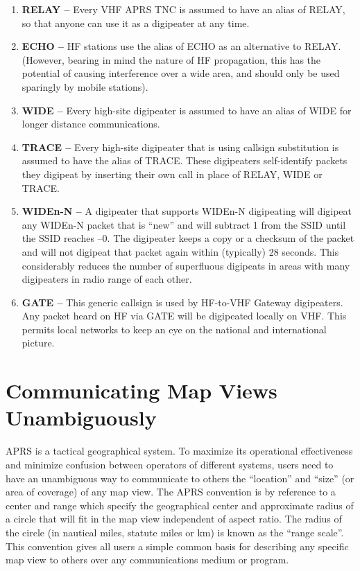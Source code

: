 \begin{enumerate}

\item \textbf{RELAY --} Every VHF APRS TNC is assumed to have an alias of
RELAY, so that anyone can use it as a digipeater at any time.

\item \textbf{ECHO --} HF stations use the alias of ECHO as an alternative to
RELAY. (However, bearing in mind the nature of HF propagation, this
has the potential of causing interference over a wide area, and should
only be used sparingly by mobile stations).

\item \textbf{WIDE --} Every high-site digipeater is assumed to have an alias of WIDE
for longer distance communications.

\item \textbf{TRACE --} Every high-site digipeater that is using callsign substitution
is assumed to have the alias of TRACE. These digipeaters self-identify
packets they digipeat by inserting their own call in place of RELAY,
WIDE or TRACE.

\item \textbf{WIDEn-N --} A digipeater that supports WIDEn-N digipeating will
digipeat any WIDEn-N packet that is “new” and will subtract 1 from the
SSID until the SSID reaches –0. The digipeater keeps a copy or a
checksum of the packet and will not digipeat that packet again within
(typically) 28 seconds. This considerably reduces the number of
superfluous digipeats in areas with many digipeaters in radio range of
each other.

\item \textbf{GATE --} This generic callsign is used by HF-to-VHF Gateway
digipeaters. Any packet heard on HF via GATE will be digipeated locally
on VHF. This permits local networks to keep an eye on the national and
international picture.

\end{enumerate}

\section{Communicating Map Views Unambiguously}

APRS is a tactical geographical system. To maximize its operational
effectiveness and minimize confusion between operators of different
systems, users need to have an unambiguous way to communicate to others
the “location” and “size” (or area of coverage) of any map view.
The APRS convention is by reference to a center and range which specify
the geographical center and approximate radius of a circle that will fit in the
map view independent of aspect ratio. The radius of the circle (in nautical
miles, statute miles or km) is known as the “range scale”. This convention
gives all users a simple common basis for describing any specific map view
to others over any communications medium or program.
